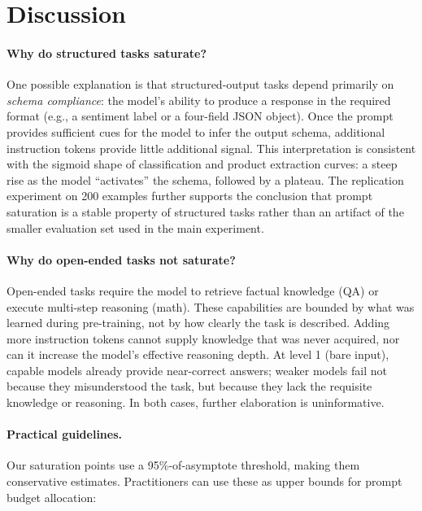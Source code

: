 \section{Discussion}
\label{sec:discussion}

\paragraph{Why do structured tasks saturate?}
One possible explanation is that structured-output tasks depend primarily on
\emph{schema compliance}: the model's ability to produce a response in the
required format (e.g., a sentiment label or a four-field JSON object).
Once the prompt provides sufficient cues for the model to infer the output
schema, additional instruction tokens provide little additional signal.
This interpretation is consistent with the sigmoid shape of classification and
product extraction curves: a steep rise as the model ``activates'' the schema,
followed by a plateau.
The replication experiment on 200 examples further supports the conclusion that
prompt saturation is a stable property of structured tasks rather than an
artifact of the smaller evaluation set used in the main experiment.

\paragraph{Why do open-ended tasks not saturate?}
Open-ended tasks require the model to retrieve factual knowledge (QA) or
execute multi-step reasoning (math).
These capabilities are bounded by what was learned during pre-training, not by
how clearly the task is described.
Adding more instruction tokens cannot supply knowledge that was never acquired,
nor can it increase the model's effective reasoning depth.
At level 1 (bare input), capable models already provide near-correct answers;
weaker models fail not because they misunderstood the task, but because they
lack the requisite knowledge or reasoning.
In both cases, further elaboration is uninformative.

\paragraph{Practical guidelines.}
Our saturation points use a 95\%-of-asymptote threshold, making them
conservative estimates.
Practitioners can use these as upper bounds for prompt budget allocation:

